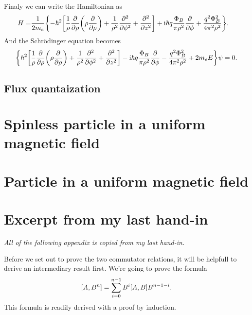 \documentclass[11pt,letter, swedish, english
]{article}
\begin{document}
Finaly we can write the Hamiltonian as
\begin{equation}
\begin{aligned}
H=&\frac{1}{2m_e}\qty{-\hbar^2\qty[
\frac{1}{\rho}\pdv{\rho}\qty(\rho\pdv{\rho})
+\frac{1}{\rho^2}\pdv[2]{\phi} + \pdv[2]{z}]
+\mathrm{i}\hbar q\frac{\Phi_B}{\pi\rho^2}\pdv{\phi}
+\frac{q^2\Phi_B^2}{4\pi^2\rho^2} }.
\end{aligned}
\end{equation}
And the Schrödinger equation becomes
\begin{equation}
\qty{\hbar^2 \qty[
\frac{1}{\rho}\pdv{\rho}\qty(\rho\pdv{\rho})
+\frac{1}{\rho^2}\pdv[2]{\phi} + \pdv[2]{z}]
-\mathrm{i}\hbar q\frac{\Phi_B}{\pi\rho^2}\pdv{\phi}
-\frac{q^2\Phi_B^2}{4\pi^2\rho^2} +2m_eE}\psi=0.
\end{equation}

\subsection{Flux quantaization}




\section{Spinless particle in a uniform magnetic field}





\section{Particle in a uniform magnetic field}

\newpage
\appendix


\section{Excerpt from my last hand-in}\label{sec:comm}
\textit{All of the following appendix is copied from my last hand-in.}

Before we set out to prove the two commutator relations, it will be
helpfull to derive an intermediary result first. We're going to prove
the formula
\begin{equation} \label{eq:comm_power}
\comm{A}{B^n} = \sum_{i=0}^{n-1} B^{i}\comm{A}{B}B^{n-1-i}.
\end{equation}
This formula is readily derived with a proof by induction. 
\end{document}
